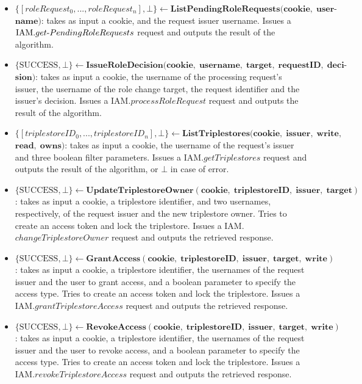 \begin{definition}
\begin{itemize}
        \item $\{[roleRequest_0,...,roleRequest_n], \bot \} \leftarrow  \mathbf{ListPendingRoleRequests(cookie, \; user\textrm{-}}$ \linebreak $\mathbf{name)}$: takes as input a cookie, and the request issuer username. Issues a $\textrm{IAM}.get\textrm{-}\linebreak PendingRoleRequests$ request and outputs the result of the algorithm.

        \item $\{\textrm{SUCCESS}, \bot\} \leftarrow \mathbf{IssueRoleDecision(cookie, \; username, \; target, \; requestID, \; deci\textrm{-}}$ \linebreak $\mathbf{sion)}$: takes as input a cookie, the username of the processing request's issuer, the username of the role change target, the request identifier and the issuer's decision. Issues a $\textrm{IAM}.processRoleRequest$ request and outputs the result of the algorithm.

        \item $\{[triplestoreID_0, ..., triplestoreID_n], \bot\} \leftarrow \mathbf{ListTriplestores(cookie, \; issuer, \; write, }$\linebreak$\mathbf{ read, \; owns)}$: takes as input a cookie, the username of the request's issuer and three boolean filter parameters. Issues a $\textrm{IAM}.getTriplestores$ request and outputs the result of the algorithm, or $\bot$ in case of error.

        \item $\{\textrm{SUCCESS}, \bot\} \leftarrow \mathbf{UpdateTriplestoreOwner(cookie, \;  triplestoreID, \; issuer, \; target)}$: takes as input a cookie, a triplestore identifier, and two usernames, respectively, of the request issuer and the new triplestore owner. Tries to create an access token and lock the triplestore. Issues a IAM.$changeTriplestoreOwner$ request and outputs the retrieved response.

        \item $\{\textrm{SUCCESS}, \bot\} \leftarrow \mathbf{GrantAccess(cookie, \;  triplestoreID, \; issuer, \; target, \; write)}$: takes as input a cookie, a triplestore identifier, the usernames of the request issuer and the user to grant access, and a boolean parameter to specify the access type. Tries to create an access token and lock the triplestore. Issues a IAM.$grantTriplestoreAccess$ request and outputs the retrieved response.

        \item $\{\textrm{SUCCESS}, \bot\} \leftarrow \mathbf{RevokeAccess(cookie, \;  triplestoreID, \; issuer, \; target, \; write)}$: takes as input a cookie, a triplestore identifier, the usernames of the request issuer and the user to revoke access, and a boolean parameter to specify the access type. Tries to create an access token and lock the triplestore. Issues a IAM.$revokeTriplestoreAccess$ request and outputs the retrieved response.


\end{itemize}
\end{definition}
